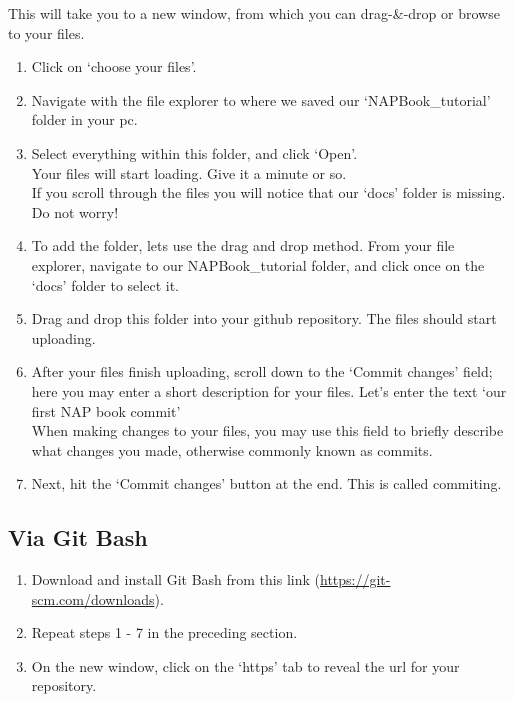 \documentclass[
]{book}
\providecommand{\tightlist}{%
  \setlength{\itemsep}{0pt}\setlength{\parskip}{0pt}}
\begin{document}
This will take you to a new window, from which you can drag-\&-drop or browse to your files.

\begin{enumerate}
\def\labelenumi{\arabic{enumi}.}
\setcounter{enumi}{8}
\tightlist
\item
  Click on `choose your files'.\\
\item
  Navigate with the file explorer to where we saved our `NAPBook\_tutorial' folder in your pc.\\
\item
  Select everything within this folder, and click `Open'.\\
  Your files will start loading. Give it a minute or so.\\
  If you scroll through the files you will notice that our `docs' folder is missing. Do not worry!\\
\item
  To add the folder, lets use the drag and drop method. From your file explorer, navigate to our NAPBook\_tutorial folder, and click once on the `docs' folder to select it.\\
\item
  Drag and drop this folder into your github repository. The files should start uploading.\\
\item
  After your files finish uploading, scroll down to the `Commit changes' field; here you may enter a short description for your files. Let's enter the text `our first NAP book commit'\\
  When making changes to your files, you may use this field to briefly describe what changes you made, otherwise commonly known as commits.\\
\item
  Next, hit the `Commit changes' button at the end. This is called commiting.
\end{enumerate}

\hypertarget{via-git-bash}{%
\subsection{Via Git Bash}\label{via-git-bash}}

\begin{enumerate}
\def\labelenumi{\arabic{enumi}.}
\tightlist
\item
  Download and install Git Bash from this link (\url{https://git-scm.com/downloads}).\\
\item
  Repeat steps 1 - 7 in the preceding section.\\
\item
  On the new window, click on the `https' tab to reveal the url for your repository.
\end{enumerate}
\end{document}
